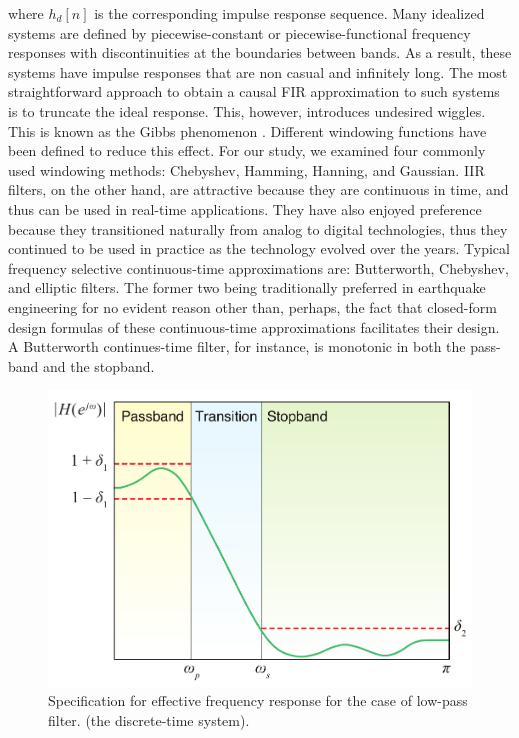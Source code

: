 \documentclass{article}
\begin{document}
where $h_d[n]$ is the corresponding impulse response sequence. Many idealized systems are defined by piecewise-constant or piecewise-functional frequency responses with discontinuities at the boundaries between bands. As a result, these systems have impulse responses that are non casual and infinitely long. The most straightforward approach to obtain a causal FIR approximation to such systems is to truncate the ideal response. This, however, introduces undesired wiggles. This is known as the Gibbs phenomenon \citep{Oppenheim_1989}. Different windowing functions have been defined to reduce this effect. For our study, we examined four commonly used windowing methods: Chebyshev, Hamming, Hanning, and Gaussian. IIR filters, on the other hand, are attractive because they are continuous in time, and thus can be used in real-time applications. They have also enjoyed preference because they transitioned naturally from analog to digital technologies, thus they continued to be used in practice as the technology evolved over the years. Typical frequency selective continuous-time approximations are: Butterworth, Chebyshev, and elliptic filters. The former two being traditionally preferred in earthquake engineering for no evident reason other than, perhaps, the fact that closed-form design formulas of these continuous-time approximations facilitates their design. A Butterworth continues-time filter, for instance, is monotonic in both the pass-band and the stopband.

\begin{figure} [H]
\begin{center}  
\includegraphics[scale=0.4]{figures/pdf/figure4.pdf} 
\caption{Specification for effective frequency response
for the case of low-pass filter. (the discrete-time system).}
\end{center}   
\end{figure}
\end{document}
